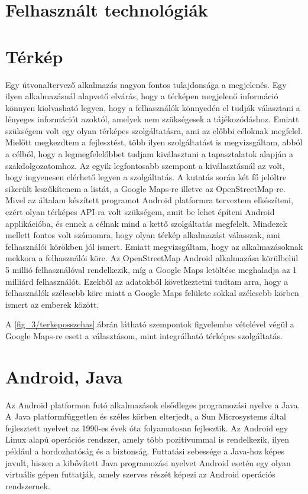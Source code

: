 	

\section{Felhasznált technológiák}
\label{felhaszntech}
\section*{Térkép}
Egy útvonaltervező alkalmazás nagyon fontos tulajdonsága a megjelenés. 
Egy ilyen alkalmazásnál alapvető elvárás, hogy a térképen megjelenő információ könnyen kiolvasható legyen, hogy a felhasználók könnyedén el tudják választani a lényeges információt azoktól, amelyek nem szükségesek a tájékozódáshoz. 
Emiatt szükségem volt egy olyan térképes szolgáltatásra, ami az előbbi céloknak megfelel. 
Mielőtt megkezdtem a fejlesztést, több ilyen szolgáltatást is megvizsgáltam, abból a célból, hogy a legmegfelelőbbet tudjam kiválasztani a tapasztalatok alapján a szakdolgozatomhoz. 
Az egyik legfontosabb szempont a kiválasztásnál az volt, hogy ingyenesen elérhető legyen a szolgáltatás. 
A kutatás során két fő jelöltre sikerült leszűkítenem a listát, a Google Maps-re illetve az OpenStreetMap-re. 
Mivel az általam készített programot Android platformra terveztem elkészíteni, ezért olyan térképes API-ra volt szükségem, amit be lehet építeni Android applikációba, és ennek a célnak mind a kettő szolgáltatás megfelelt. 
Mindezek mellett fontos volt számomra, hogy olyan térkép alkalmazást válasszak, ami felhasználói körökben jól ismert. 
Emiatt megvizsgáltam, hogy az alkalmazásoknak mekkora a felhasználói köre. 
Az OpenStreetMap Android alkalmazása körülbelül 5 millió  felhasználóval rendelkezik, míg a Google Maps letöltése meghaladja az 1 milliárd felhasználót. 
Ezekből az adatokból következtetni tudtam arra, hogy a felhasználók szélesebb köre miatt a Google Maps felülete sokkal szélesebb körben ismert az emberek között.


A \ref{fig_3/terkeposszehas}.ábrán látható szempontok figyelembe vételével végül a Google Maps-re esett a választásom, mint integrálható térképes szolgáltatás.

\section*{Android, Java}
Az Android platformon futó alkalmazások elsődleges programozási nyelve a Java.
A Java platformfüggetlen és széles körben elterjedt, a Sun Microsystems által fejlesztett nyelvet az 1990-es évek óta folyamatosan fejlesztik.
Az Android egy Linux alapú operációs rendszer, amely több pozitívummal is rendelkezik, ilyen például a hordozhatóság és a biztonság.
Futtatási sebessége a Java-hoz képes javult, hiszen a kibővített Java programozási nyelvet Android esetén egy olyan virtuális gépen futtatják, amely szerves részét képezi az Android operációs rendszernek.

